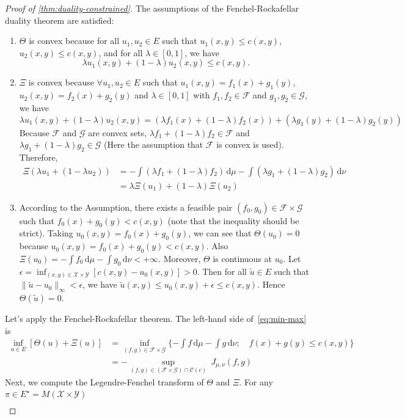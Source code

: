 \documentclass[10pt]{article}
\newcommand{\ud}{\,\mathrm{d}}
\renewcommand{\tilde}{\widetilde}
\newcommand{\calC}{\mathcal{C}}
\newcommand{\calF}{\mathcal{F}}
\newcommand{\calG}{\mathcal{G}}
\newcommand{\calX}{\mathcal{X}}
\newcommand{\calY}{\mathcal{Y}}
\numberwithin{equation}{section}
\begin{document}
\begin{proof}[Proof of \autoref{thm:duality-constrained}]
	The assumptions of the Fenchel-Rockafellar duality theorem are satisfied: 
	\begin{enumerate}
		\item $\Theta$ is convex because for all $u_1,u_2 \in E$ such that $u_1(x,y)\leq c(x,y)$, $u_2(x,y)\leq c(x,y)$, and for all $\lambda \in[0,1]$, we have \[\lambda u_1(x,y) + (1-\lambda)u_2(x,y)\leq c(x,y).\] 
		\item $\Xi$ is convex because $\forall u_1,u_2 \in E$ such that $u_1(x,y)= f_1(x)+g_1(y)$, $u_2(x,y)=f_2(x)+g_2(y)$ and $\lambda \in[0,1]$ with $f_1,f_2 \in \calF$ and $g_1,g_2\in \calG$, we have 
		\[\lambda u_1(x,y) + (1-\lambda)u_2(x,y) = (\lambda f_1(x) + (1-\lambda)f_2(x)) + (\lambda g_1(y) + (1-\lambda)g_2(y))\]
		Because $\calF$ and $\calG$ are convex sets, $\lambda f_1 + (1-\lambda)f_2 \in \calF$ and $\lambda g_1 + (1-\lambda)g_2 \in \calG$ (Here the assumption that $\calF$ is convex is used). Therefore, 
		\begin{align*}
		\Xi(\lambda u_1 +(1-\lambda u_2)) &= -\int (\lambda f_1 + (1-\lambda) f_2)\ud \mu - \int (\lambda g_1 + (1-\lambda)g_2)\ud \nu \\&=\lambda \Xi(u_1)+ (1-\lambda)\Xi(u_2)
		\end{align*}
		\item According to the Assumption, there exists a feasible pair $(f_0,g_0)\in \calF \times \calG$ such that $f_0(x)+g_0(y)
		< c(x,y)$ (note that the inequality should be strict). Taking $u_0(x,y)=f_0(x)+g_0(y)$, we can see that $\Theta(u_0)=0$ because $u_0(x,y)=f_0(x)+g_0(y)<c(x,y)$. Also $\Xi(u_0)= -\int f_0\ud \mu -\int g_0 \ud \nu < +\infty$. Moreover, $\Theta$ is continuous at $u_0$. Let $\epsilon = \inf_{(x,y)\in\calX\times \calY} [c(x,y)-u_0(x,y)]>0$. Then for all $\tilde{u}\in E$ such that $\|\tilde{u}-u_0\|_\infty <\epsilon$, we have $\tilde{u}(x,y)\leq u_0(x,y)+\epsilon \leq c(x,y)$. Hence $\Theta(\tilde{u})=0$.
	\end{enumerate}
	Let's apply the Fenchel-Rockafellar theorem. The left-hand side of~\eqref{eq:min-max} is
	\begin{align*}
	\inf_{u\in E}\left[\Theta(u)+\Xi(u)\right] &= \inf_{(f,g)\in \calF \times \calG}\{-\int f\ud \mu - \int g\ud \nu;\quad f(x)+g(y)\leq c(x,y)\}\\
	&=-\sup_{(f,g)\in (\calF \times \calG)\cap \calC(c)}~J_{\mu,\nu}(f,g)
	\end{align*}
	Next, we compute the Legendre-Fenchel transform of $\Theta$ and $\Xi$. For any $\pi \in E^\star=M(\calX \times \calY)$ 
	\begin{align*}

\end{align*}
\end{proof}
\end{document}
